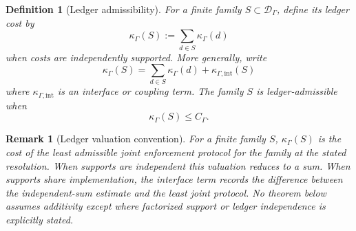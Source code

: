 \documentclass[11pt]{article}
\newtheorem{definition}[theorem]{Definition}
\newtheorem{remark}[theorem]{Remark}
\begin{document}
\begin{definition}[Ledger admissibility]
For a finite family $S\subset\mathcal D_\Gamma$, define its ledger cost by
\[
 \kappa_\Gamma(S):=\sum_{d\in S}\kappa_\Gamma(d)
\]
when costs are independently supported.  More generally, write
\[
 \kappa_\Gamma(S)=\sum_{d\in S}\kappa_\Gamma(d)+\kappa_{\Gamma,\mathrm{int}}(S)
\]
where $\kappa_{\Gamma,\mathrm{int}}$ is an interface or coupling term.  The family $S$ is ledger-admissible when
\[
 \kappa_\Gamma(S)\le C_\Gamma .
\]
\end{definition}

\begin{remark}[Ledger valuation convention]\label{rem:ledger-valuation-convention}
For a finite family $S$, $\kappa_\Gamma(S)$ is the cost of the least admissible joint enforcement protocol for the family at the stated resolution.  When supports are independent this valuation reduces to a sum.  When supports share implementation, the interface term records the difference between the independent-sum estimate and the least joint protocol.  No theorem below assumes additivity except where factorized support or ledger independence is explicitly stated.
\end{remark}
\end{document}
